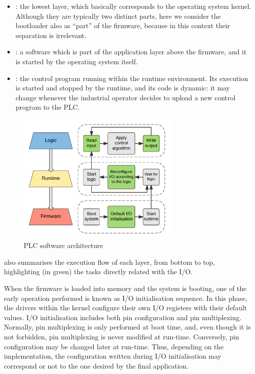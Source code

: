 \begin{itemize}
	\item {}: the lowest layer, which basically corresponds to the operating system kernel. Although they are typically two distinct parts,
		here we consider the bootloader also as ``part'' of the firmware, because in this context their separation is irrelevant.
	\item {}: a software which is part of the application layer above the firmware, and it is started by the operating system itself.
	\item {}: the control program running within the runtime environment. Its execution is started and stopped by the runtime,
		and its code is dynamic: it may change whenever the industrial operator decides to upload a new control program to the PLC.
\end{itemize}

\begin{figure}[h]
\centerline{\includegraphics[width=0.7\textwidth]{res/plc_swarch}}
\caption{PLC software architecture \label{fig:plc_swarch}}
\end{figure}

 also summarises the execution flow of each layer, from bottom to top, highlighting (in green) the tasks directly related with the I/O.

When the firmware is loaded into memory and the system is booting, one of the early operation performed is known as I/O initialisation sequence.
In this phase, the drivers within the kernel configure their own I/O registers with their default values.
I/O initialisation includes both pin configuration and pin multiplexing. Normally, pin multiplexing is only performed at boot time, and, even though it is not forbidden,
pin multiplexing is never modified at run-time. Conversely, pin configuration may be changed later at run-time. Thus, depending on the implementation, the configuration
written during I/O initialisation may correspond or not to the one desired by the final application.

